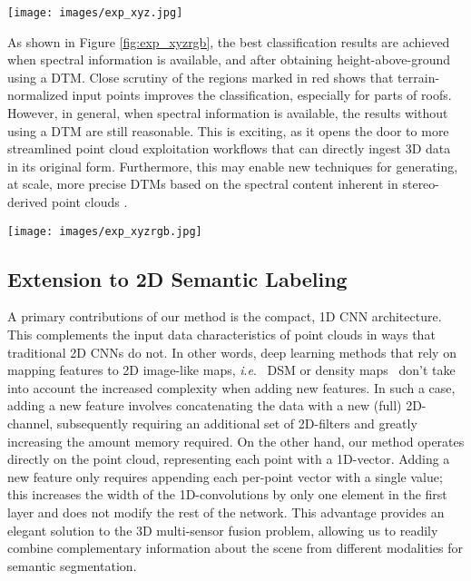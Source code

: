 \documentclass[final,3p,times,twocolumn,authoryear]{elsarticle}
\newcommand{\ie}{\textit{i}.\textit{e}.}
\begin{document}
\begin{figure*}[th]
\begin{center}
\texttt{[image: images/exp\_xyz.jpg]}
\end{center}
\caption{A comparison between training with (bottom) and without (top) a digital terrain model using only 3D-coordinates for block sizes. }
\label{fig:exp_xyz}
\end{figure*}
As shown in Figure \ref{fig:exp_xyzrgb}, the best classification results are achieved when spectral information is available, and after obtaining height-above-ground using a DTM.
Close scrutiny of the regions marked in red shows that terrain-normalized input points improves the classification, especially for parts of roofs. 
However, in general, when spectral information is available, the results without using a DTM are still reasonable.
This is exciting, as it opens the door to more streamlined point cloud exploitation workflows that can directly ingest 3D data in its original form.
Furthermore, this may enable new techniques for generating, at scale, more precise DTMs based on the spectral content inherent in stereo-derived point clouds \citep{tapper2016extraction}. 



\begin{figure*}[th]
\begin{center}
\texttt{[image: images/exp\_xyzrgb.jpg]}
\end{center}
\caption{A comparison between training with and without a digital terrain model using 3D-coordinates and spectral data. Regions marked with red highlight differences.}
\label{fig:exp_xyzrgb}
\end{figure*}

\subsection{Extension to 2D Semantic Labeling}
\label{sec:extension_to_2D}
A primary contributions of our method is the compact, 1D CNN architecture.
This complements the input data characteristics of point clouds in ways that traditional 2D CNNs do not. 
In other words, deep learning methods that rely on mapping features to 2D image-like maps, \ie~ DSM or density maps~\citep{MVCNN,Luca,Yansong} don't take into account the increased complexity when adding new features. 
In such a case, adding a new feature involves concatenating the data with a new (full) 2D-channel, subsequently requiring an additional set of 2D-filters and greatly increasing the amount memory required. 
On the other hand, our method operates directly on the point cloud, representing each point with a 1D-vector. 
Adding a new feature only requires appending each per-point vector with a single value; this increases the width of the 1D-convolutions by only one element in the first layer and does not modify the rest of the network. 
This advantage provides an elegant solution to the 3D multi-sensor fusion problem, allowing us to readily combine complementary information about the scene from different modalities for semantic segmentation. 
\end{document}
